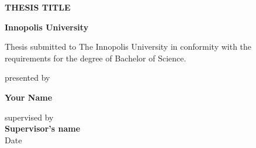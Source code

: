 \begin{titlepage}

\begin{center}

\textbf{\Large{THESIS TITLE}}
\vspace{4cm}

\textbf{\Large Innopolis University} \\

\vspace{0.60cm}

{\Large Thesis submitted to The Innopolis University in conformity with the
requirements for the degree of Bachelor of Science.}

\vspace{6cm}

{\Large presented by}

\vspace{0.40cm}

\textbf{\Large Your Name}
\vspace{0.40cm}

{\Large supervised by}\\
\vspace{0.40cm}
{\bf\Large Supervisor's name}\\
\vspace{0.60cm}
{\Large Date}



\end{center}
\end{titlepage}
